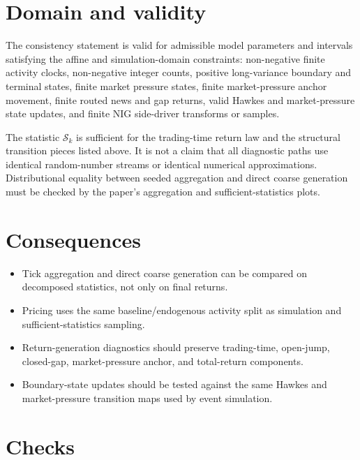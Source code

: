 \documentclass[11pt]{article}
\begin{document}
\section{Domain and validity}

The consistency statement is valid for admissible model parameters and
intervals satisfying the affine and simulation-domain constraints:
non-negative finite activity clocks, non-negative integer counts, positive
long-variance boundary and terminal states, finite market pressure
states, finite market-pressure anchor movement, finite routed news and
gap returns, valid Hawkes and market-pressure state updates, and finite
NIG side-driver transforms or samples.

The statistic \(\mathcal S_k\) is sufficient for the trading-time return law
and the structural transition pieces listed above.
It is not a claim that all diagnostic paths use identical random-number streams
or identical numerical approximations.
Distributional equality between seeded aggregation and direct coarse generation
must be checked by the paper's aggregation and sufficient-statistics plots.

\section{Consequences}

\begin{itemize}
    \item Tick aggregation and direct coarse generation can be compared on decomposed statistics, not only on final returns.
    \item Pricing uses the same baseline/endogenous activity split as simulation and sufficient-statistics sampling.
    \item Return-generation diagnostics should preserve trading-time, open-jump, closed-gap, market-pressure anchor, and total-return components.
    \item Boundary-state updates should be tested against the same Hawkes and market-pressure transition maps used by event simulation.
\end{itemize}

\section{Checks}
\end{document}
